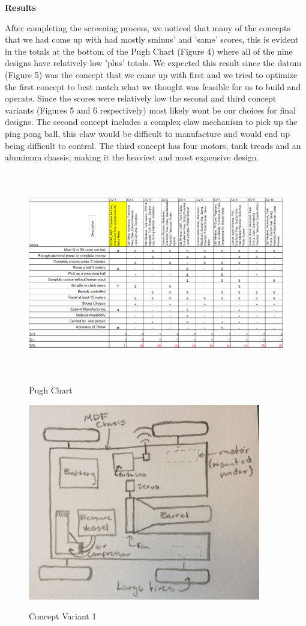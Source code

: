 \documentclass[12pt,letterpaper,titlepage]{article}
\begin{document}
\smallskip\noindent\textbf{Results}

After completing the screening process, we noticed that many of the concepts that we had come up with had mostly sminus' and 'same' scores, this is evident in the totals at the bottom of the Pugh Chart (Figure 4) where all of the nine designs have relatively low 'plus' totals. We expected this result since the datum (Figure 5) was the concept that we came up with first and we tried to optimize the first concept to best match what we thought was feasible for us to build and operate. Since the scores were relatively low the second and third concept variants (Figures 5 and 6 respectively) most likely wont be our choices for final designs. The second concept includes a complex claw mechanism to pick up the ping pong ball, this claw would be difficult to manufacture and would end up being difficult to control. The third concept has four motors, tank treads and an aluminum chassis; making it the heaviest and most expensive design.
\begin{figure}[H]
	\centering
	\includegraphics[height=3.5in]{images/CVscreen}
	\label{fig:CVscreen}
	\caption{Pugh Chart}
\end{figure}

\begin{figure}[H]
	\centering
	\includegraphics[width=4in]{images/CV1}
	\label{fig:CV1}
	\caption{Concept Variant 1}
\end{figure}
\end{document}
